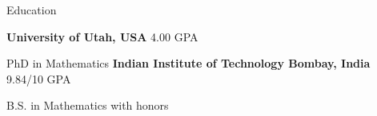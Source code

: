 \begin{rubric}{Education}

\entry*[2022 -- present]%
	\textbf{University of Utah, USA} \hfill 4.00 GPA
	\par PhD in Mathematics
\entry*[2018 -- 2022]%
	\textbf{Indian Institute of Technology Bombay, India} \hfill 9.84/10 GPA
	\par B.S. in Mathematics with honors

\vspace{1mm}

\end{rubric}

